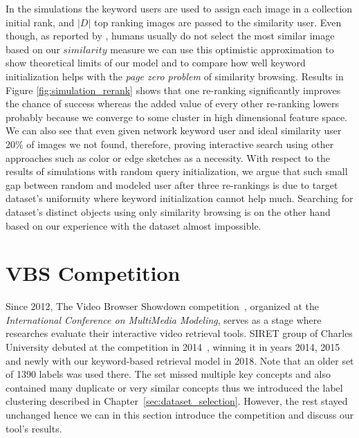 In the simulations the keyword users are used to assign each image in a collection initial rank, and $|D|$ top ranking images are passed to the similarity user. Even though, as reported by \cite{kovalvcik2017comparison}, humans usually do not select the most similar image based on our $similarity$ measure we can use this optimistic approximation to show theoretical limits of our model and to compare how well keyword initialization helps with the \textit{page zero problem} of similarity browsing.
Results in Figure \ref{fig:simulation_rerank} shows that one re-ranking significantly improves the chance of success whereas the added value of every other re-ranking lowers probably because we converge to some cluster in high dimensional feature space. We can also see that even given network keyword user and ideal similarity user 20\% of images we not found, therefore, proving interactive search using other approaches such as color or edge sketches as a necessity. With respect to the results of simulations with random query initialization, we argue that such small gap between random and modeled user after three re-rankings is due to target dataset's uniformity where keyword initialization cannot help much. Searching for dataset's distinct objects using only similarity browsing is on the other hand based on our experience with the dataset almost impossible.



\section{VBS Competition}

Since 2012, The Video Browser Showdown competition~\cite{cobarzan2017interactive,Lokoc-influential-trends}, organized at the \textit{International Conference on MultiMedia Modeling}, serves as a stage where researches evaluate their interactive video retrieval tools. SIRET group of Charles University debuted at the competition in 2014~\cite{Lokoc-VBS2014}, winning it in years 2014, 2015 and newly with our keyword-based retrieval model in 2018. Note that an older set of 1390 labels was used there. The set missed multiple key concepts and also contained many duplicate or very similar concepts thus we introduced the label clustering described in Chapter~\ref{sec:dataset_selection}. However, the rest stayed unchanged hence we can in this section introduce the competition and discuss our tool's results.

